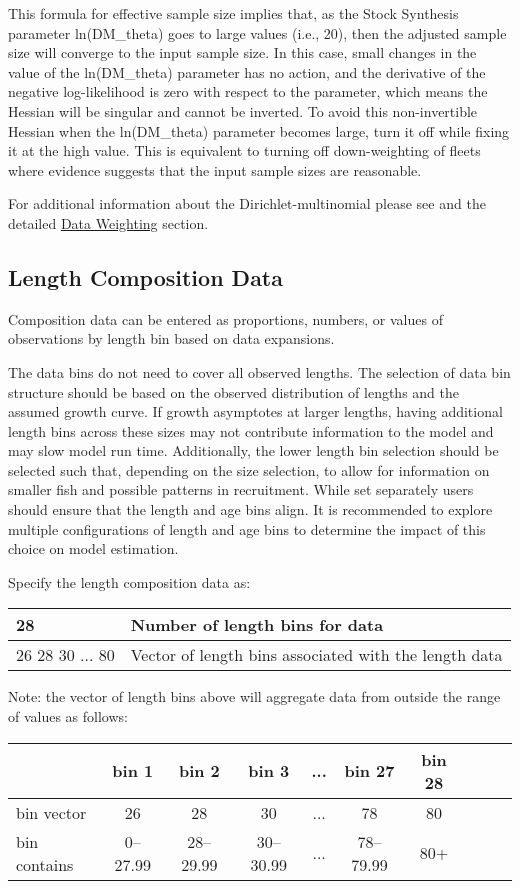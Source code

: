 This formula for effective sample size implies that, as the Stock Synthesis parameter ln(DM\_theta) goes to large values (i.e., 20), then the adjusted sample size will converge to the input sample size.  In this case, small changes in the value of the ln(DM\_theta) parameter has no action, and the derivative of the negative log-likelihood is zero with respect to the parameter, which means the Hessian will be singular and cannot be inverted. To avoid this non-invertible Hessian when the ln(DM\_theta) parameter becomes large, turn it off while fixing it at the high value. This is equivalent to turning off down-weighting of fleets where evidence suggests that the input sample sizes are reasonable.
	
For additional information about the Dirichlet-multinomial please see \citet{thorson-model-based-2017} and the detailed \hyperlink{DataWeight}{Data Weighting} section.

\hypertarget{CompTiming}{}
\subsection{Length Composition Data}
Composition data can be entered as proportions, numbers, or values of observations by length bin based on data expansions.  

The data bins do not need to cover all observed lengths.  The selection of data bin structure should be based on the observed distribution of lengths and the assumed growth curve. If growth asymptotes at larger lengths, having additional length bins across these sizes may not contribute information to the model and may slow model run time.  Additionally, the lower length bin selection should be selected such that, depending on the size selection, to allow for information on smaller fish and possible patterns in recruitment. While set separately users should ensure that the length and age bins align.  It is recommended to explore multiple configurations of length and age bins to determine the impact of this choice on model estimation.

Specify the length composition data as:
\begin{center}
	\begin{tabular}{p{4cm} p{10cm}}
		\hline
		28 & Number of length bins for data  \\
		\hline
		26 28 30 ... 80 &  Vector of length bins associated with the length data\\
		\hline
	\end{tabular}
\end{center}
Note: the vector of length bins above will aggregate data from outside
the range of values as follows:
\begin{center}
    \begin{tabular}{lccccccccc}
		\hline
  		             & bin 1 & bin 2 & bin 3 & ... & bin 27 & bin 28 \\ 
		\hline
 		bin vector   & 26 & 28 & 30 & ... & 78 & 80 \\ 
    	bin contains & 0--27.99 & 28--29.99 & 30--30.99 & ... & 78--79.99 & 80+ \\
		\hline
    \end{tabular}
\end{center}

